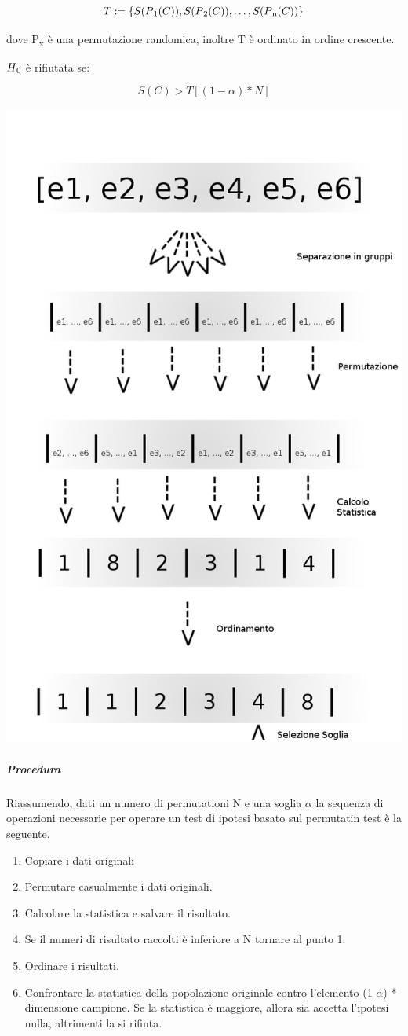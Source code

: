 $$ T := \{S(P\textsubscript{1}(C)), S(P\textsubscript{2}(C)), \dots, S(P\textsubscript{n}(C))\}$$

dove P\textsubscript{x} è una permutazione randomica, inoltre T è ordinato in ordine crescente.
 
$H\textsubscript{0}$ è rifiutata se:

$$ S(C) > T[(1 - \alpha)*N]$$

\begin{center} 

\includegraphics[width=0.7\linewidth]{processo}
\end{center}



\subparagraph{Procedura}
Riassumendo, dati un numero di permutationi N e una soglia $\alpha$ la sequenza di operazioni necessarie per operare un test di ipotesi basato sul permutatin test è la seguente.
\begin{enumerate}
	\item Copiare i dati originali
	\item Permutare casualmente i dati originali.
	\item Calcolare la statistica e salvare il risultato.
	\item Se il numeri di risultato raccolti è inferiore a N tornare al punto 1.
	\item Ordinare i risultati.
	\item Confrontare la statistica della popolazione originale contro l'elemento (1-$\alpha$) * dimensione campione. Se la statistica è maggiore, allora sia accetta l'ipotesi nulla, altrimenti la si rifiuta.
\end{enumerate}

